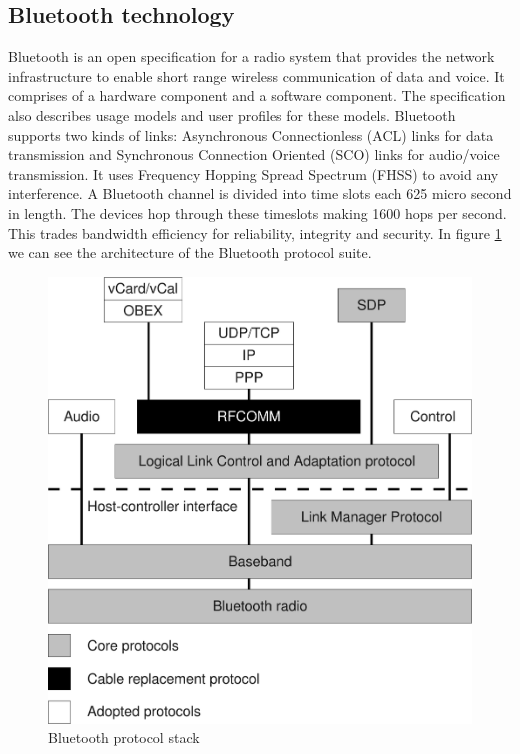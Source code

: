 \documentclass[conference]{IEEEtran}
\begin{document}
\subsection{Bluetooth technology}
Bluetooth is an open specification for a radio system that provides the network infrastructure to enable short range wireless communication of data and voice. It comprises of a hardware component and a software component. The specification also describes usage models and user profiles for these models.
Bluetooth supports two kinds of links: Asynchronous Connectionless (ACL) links for data transmission and Synchronous Connection Oriented (SCO) links for audio/voice transmission. It uses Frequency Hopping Spread Spectrum (FHSS) to avoid any interference. A Bluetooth channel is divided into time slots each 625 micro second in length. The devices hop through these timeslots making 1600 hops per second. This trades bandwidth efficiency for reliability, integrity and security.
In figure \ref{stack} we can see the architecture of the Bluetooth protocol suite.
\\
\begin{figure}[h]
\centering
\includegraphics[scale=0.3]{BTstack.pdf}
\caption{Bluetooth protocol stack}
\label{stack}
\end{figure}
\end{document}
